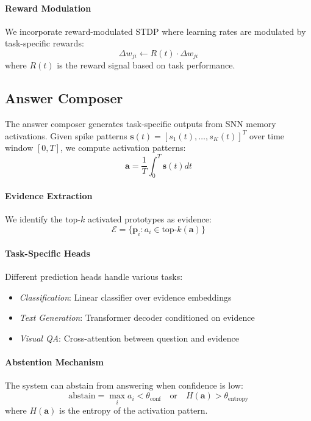 \documentclass{article}
\begin{document}
\paragraph{Reward Modulation} We incorporate reward-modulated STDP where learning rates are modulated by task-specific rewards:
\begin{equation}
\Delta w_{ji} \leftarrow R(t) \cdot \Delta w_{ji}
\end{equation}
where $R(t)$ is the reward signal based on task performance.

\subsection{Answer Composer}
\label{sec:answer_composer}

The answer composer generates task-specific outputs from SNN memory activations. Given spike patterns $\mathbf{s}(t) = [s_1(t), \ldots, s_K(t)]^T$ over time window $[0, T]$, we compute activation patterns:
\begin{equation}
\mathbf{a} = \frac{1}{T} \int_0^T \mathbf{s}(t) dt
\end{equation}

\paragraph{Evidence Extraction} We identify the top-$k$ activated prototypes as evidence:
\begin{equation}
\mathcal{E} = \{\mathbf{p}_i : a_i \in \text{top-}k(\mathbf{a})\}
\end{equation}

\paragraph{Task-Specific Heads} Different prediction heads handle various tasks:
\begin{itemize}
\item \emph{Classification}: Linear classifier over evidence embeddings
\item \emph{Text Generation}: Transformer decoder conditioned on evidence
\item \emph{Visual QA}: Cross-attention between question and evidence
\end{itemize}

\paragraph{Abstention Mechanism} The system can abstain from answering when confidence is low:
\begin{equation}
\text{abstain} = \max_i a_i < \theta_{\text{conf}} \quad \text{or} \quad H(\mathbf{a}) > \theta_{\text{entropy}}
\end{equation}
where $H(\mathbf{a})$ is the entropy of the activation pattern.
\end{document}
